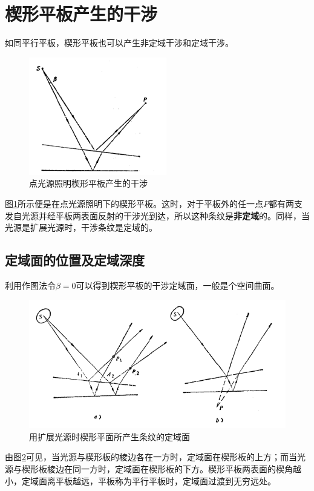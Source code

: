 \documentclass[UTF8]{ctexart}
\begin{document}
	\section{楔形平板产生的干涉}
	如同平行平板，楔形平板也可以产生非定域干涉和定域干涉。
	\begin{figure}[H]
		\centering
		\includegraphics[width=6cm]{xie_point_light.png}
		\caption{点光源照明楔形平板产生的干涉}
		\label{figure_xie_point}
	\end{figure}

	图\ref{figure_xie_point}所示便是在点光源照明下的楔形平板。这时，对于平板外的任一点$ P $都有两支发自光源并经平板两表面反射的干涉光到达，所以这种条纹是\textbf{非定域}的。同样，当光源是扩展光源时，干涉条纹是定域的。
	
	\subsection{定域面的位置及定域深度}
	利用作图法令$ \beta=0 $可以得到楔形平板的干涉定域面，一般是个空间曲面。
	\begin{figure}[htbp]
		\centering
		\includegraphics[width=12cm]{xie_extern_light.png}
		\caption{用扩展光源时楔形平面所产生条纹的定域面}
		\label{figure_xie_extern}
	\end{figure}

\noindent 由图\ref{figure_xie_extern}可见，当光源与楔形板的棱边各在一方时，定域面在楔形板的上方；而当光源与楔形板棱边在同一方时，定域面在楔形板的下方。楔形平板两表面的楔角越小，定域面离平板越远，平板称为平行平板时，定域面过渡到无穷远处。
\end{document}
